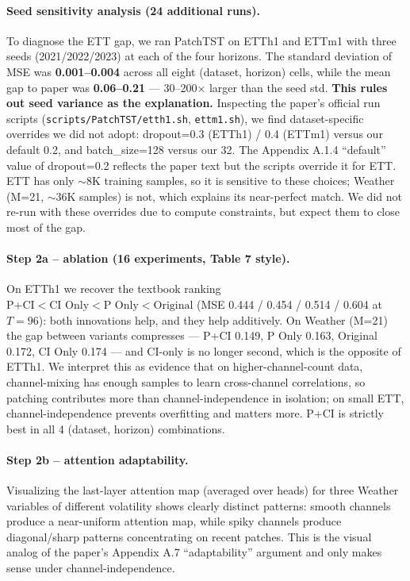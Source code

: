 \documentclass[11pt]{article}
\begin{document}
\paragraph{Seed sensitivity analysis (24 additional runs).} To diagnose the ETT gap, we ran PatchTST on ETTh1 and ETTm1 with three seeds (2021/2022/2023) at each of the four horizons. The standard deviation of MSE was \textbf{0.001--0.004} across all eight (dataset, horizon) cells, while the mean gap to paper was \textbf{0.06--0.21} --- 30--200$\times$ larger than the seed std. \textbf{This rules out seed variance as the explanation.} Inspecting the paper's official run scripts (\texttt{scripts/PatchTST/etth1.sh}, \texttt{ettm1.sh}), we find dataset-specific overrides we did not adopt: dropout=0.3 (ETTh1) / 0.4 (ETTm1) versus our default 0.2, and batch\_size=128 versus our 32. The Appendix A.1.4 ``default'' value of dropout=0.2 reflects the paper text but the scripts override it for ETT. ETT has only $\sim$8K training samples, so it is sensitive to these choices; Weather (M=21, $\sim$36K samples) is not, which explains its near-perfect match. We did not re-run with these overrides due to compute constraints, but expect them to close most of the gap.

\paragraph{Step 2a -- ablation (16 experiments, Table 7 style).} On ETTh1 we recover the textbook ranking $\text{P+CI} < \text{CI Only} < \text{P Only} < \text{Original}$ (MSE 0.444 / 0.454 / 0.514 / 0.604 at $T{=}96$): both innovations help, and they help additively. On Weather (M=21) the gap between variants compresses --- P+CI 0.149, P Only 0.163, Original 0.172, CI Only 0.174 --- and CI-only is no longer second, which is the opposite of ETTh1. We interpret this as evidence that on higher-channel-count data, channel-mixing has enough samples to learn cross-channel correlations, so patching contributes more than channel-independence in isolation; on small ETT, channel-independence prevents overfitting and matters more. P+CI is strictly best in all 4 (dataset, horizon) combinations.

\paragraph{Step 2b -- attention adaptability.} Visualizing the last-layer attention map (averaged over heads) for three Weather variables of different volatility shows clearly distinct patterns: smooth channels produce a near-uniform attention map, while spiky channels produce diagonal/sharp patterns concentrating on recent patches. This is the visual analog of the paper's Appendix A.7 ``adaptability'' argument and only makes sense under channel-independence.
\end{document}
